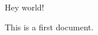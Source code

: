 \documentclass[a4paper]{article}
\begin{document}
Hey world!

This is a first document. 
\end{document}

